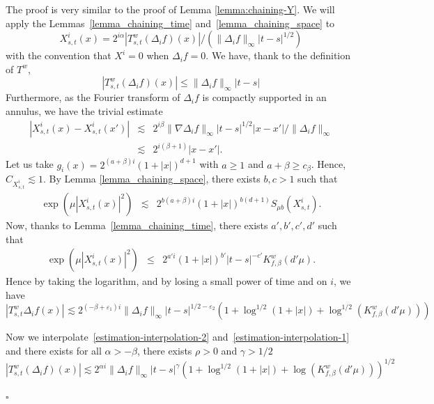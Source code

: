 \documentclass[a4paper,11pt]{article}
\newenvironment{proof}{{\sc Proof.}}{\hfill$\square$}
\begin{document}
\begin{proof}
  The proof is very similar to the proof of Lemma \ref{lemma:chaining-Y}. We
  will apply the Lemmas~\ref{lemma_chaining_time}
  and~\ref{lemma_chaining_space} to
  \[ X^{i}_{s,t} ( x ) =2^{i \alpha} | T^{w}_{s,t} ( \Delta_{i} f ) ( x ) | /
     ( \| \Delta_{i} f \|_{\infty} | t-s |^{1/2} ) \]
  with the convention that $X^{i} =0$ when $\Delta_{i} f=0$. We have, thank to
  the definition of $T^{w}$,
  \begin{equation}
    | T^{w}_{s,t} ( \Delta_{i} f ) ( x ) | \leqslant \| \Delta_{i} f
    \|_{\infty} | t-s |^{} \label{estimation-interpolation-1}
  \end{equation}
  Furthermore, as the Fourier transform of $\Delta_{i} f$ is compactly
  supported in an annulus, we have the trivial estimate
  \begin{eqnarray*}
    | X^{i}_{s,t} ( x ) -X^{i}_{s,t} ( x' ) | & \lesssim & 2^{i \beta} \|
    \nabla \Delta_{i} f \|_{\infty} | t-s |^{1/2} | x-x' | / \| \Delta_{i} f
    \|_{\infty}\\
    & \lesssim & 2^{i ( \beta +1 )} | x-x' | .
  \end{eqnarray*}
  Let us take $g_{i} ( x ) =2^{( a+ \beta ) i} ( 1+ | x | )^{d+1}$ with $a
  \geqslant 1$ and $a+ \beta \geqslant c_{\beta}$. Hence, $C_{X^{i}_{s,t}}
  \lesssim 1$. By Lemma \ref{lemma_chaining_space}, there exists $b,c>1$ such
  that
  \begin{eqnarray*}
    \exp ( \mu | X^{i}_{s,t} ( x ) |^{2} ) & \lesssim & 2^{b  ( a+ \beta ) i}
    ( 1+ | x | )^{b ( d+1 )} S_{\mu b} ( X^{i}_{s,t} ) .
  \end{eqnarray*}
  Now, thanks to Lemma~\ref{lemma_chaining_time}, there exists $a' ,b' ,c'
  ,d'$ such that
  \begin{eqnarray*}
    \exp ( \mu | X^{i}_{s,t} ( x ) |^{2} ) & \leqslant & 2^{a' i} ( 1+ | x |
    )^{b'} | t-s |^{-c'} K^{w}_{f, \beta} ( d' \mu ) .
  \end{eqnarray*}
  Hence by taking the logarithm, and by losing a small power of time and on
  $i$, we have
  \begin{equation}
    | T^{w}_{s,t} \Delta_{i} f ( x ) |^{} \lesssim 2^{( - \beta +
    \varepsilon_{1} ) i} \| \Delta_{i} f \|_{\infty} | t-s |^{1/2-
    \varepsilon_{2}} ( 1+ \log^{1/2} ( 1+ | x | ) + \log^{1/2} ( K_{f,
    \beta}^{w} ( d' \mu ) ) ) \label{estimation-interpolation-2}
  \end{equation}
  
  
  Now we interpolate~{\eqref{estimation-interpolation-2}}
  and~{\eqref{estimation-interpolation-1}} and there exists for all $\alpha
  >- \beta$, there exists $\rho >0$ and $\gamma >1/2$
  \[ | T^{w}_{s,t} ( \Delta_{i} f ) ( x ) | \lesssim 2 ^{\alpha i} \|
     \Delta_{i} f \|_{\infty} | t-s |^{\gamma} ( 1+ \log^{1/2} ( 1+ | x | ) +
     \log ( K_{f, \beta}^{w} ( d' \mu ) ) )^{1/2} \]
  
\end{proof}
\end{document}
